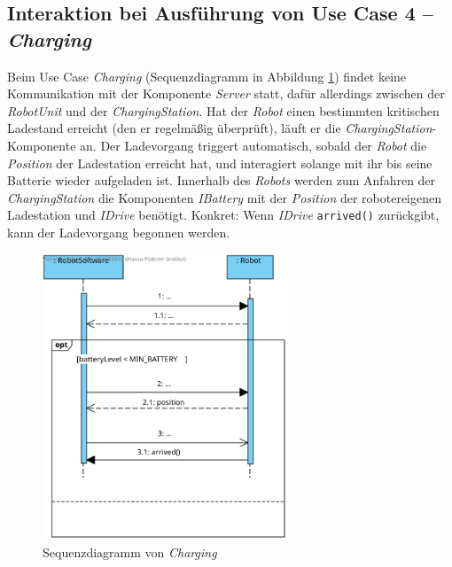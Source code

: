 	
	
	\subsection*{Interaktion bei Ausführung von Use Case 4 – \emph{Charging}}
	Beim Use Case \emph{Charging} (Sequenzdiagramm in Abbildung \ref{Charging}) findet keine Kommunikation mit der Komponente \emph{Server} statt, dafür allerdings zwischen der \emph{RobotUnit} und der \emph{Charging\-Station}. Hat der \emph{Robot} einen bestimmten kritischen Ladestand erreicht (den er regelmäßig überprüft), läuft er die \emph{Charging\-Station}-Komponente an. Der Ladevorgang triggert automatisch, sobald der \emph{Robot} die \emph{Position} der Ladestation erreicht hat, und interagiert solange mit ihr bis seine Batterie wieder aufgeladen ist. Innerhalb des \emph{Robots} werden zum Anfahren der \emph{ChargingStation} die Komponenten \emph{IBattery} mit der \emph{Position} der robotereigenen Ladestation und \emph{IDrive} benötigt. Konkret: Wenn \emph{IDrive} \texttt{arrived()} zurückgibt, kann der Ladevorgang begonnen werden.
	\vspace{1cm}
	
	\begin{figure}[H]
		\centering
		\includegraphics[width=0.65\textwidth]{img/0-Entwurf-8-Charging}
		\caption{Sequenzdiagramm von \textit{Charging}}
		\label{Charging}
	\end{figure}
